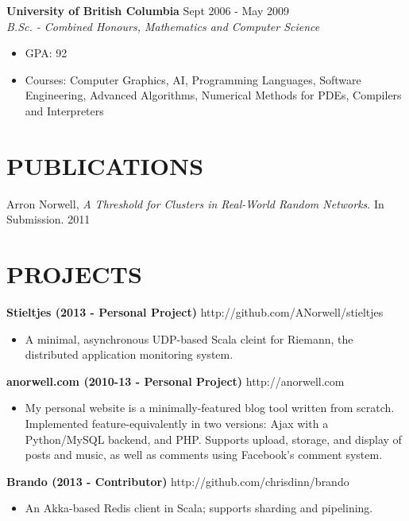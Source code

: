 \documentclass[line,margin]{res}
\begin{document}
\begin{resume}
    {\bf University of British Columbia} \hfill Sept 2006 - May 2009 \\
    {\sl B.Sc. - Combined Honours, Mathematics and Computer Science}
                 \begin{itemize}  \itemsep -2pt %
                 \item GPA: 92\item Courses: Computer Graphics, AI, Programming Languages, Software Engineering, Advanced Algorithms, Numerical Methods for PDEs, Compilers and Interpreters 
                \end{itemize}
  

\section{PUBLICATIONS}

    Arron Norwell, {\sl A Threshold for Clusters in Real-World Random Networks}. In Submission.  \hfill 2011 \\
  

\section{PROJECTS}

{\bf Stieltjes (2013 - Personal Project)} \hfill http://github.com/ANorwell/stieltjes
                 \begin{itemize}  \itemsep -2pt %
                 \item A minimal, asynchronous UDP-based Scala cleint for Riemann, the distributed application monitoring system. 
                \end{itemize}
  
{\bf anorwell.com (2010-13 - Personal Project)} \hfill http://anorwell.com
                 \begin{itemize}  \itemsep -2pt %
                 \item My personal website is a minimally-featured blog tool written from scratch. Implemented feature-equivalently in two versions: Ajax with a Python/MySQL backend, and PHP.  Supports upload, storage, and display of posts and music, as well as comments using Facebook's comment system. 
                \end{itemize}
  
{\bf Brando (2013 - Contributor)} \hfill http://github.com/chrisdinn/brando
                 \begin{itemize}  \itemsep -2pt %
                 \item An Akka-based Redis client in Scala; supports sharding and pipelining.
                \end{itemize}
  

\end{resume}
\end{document}
